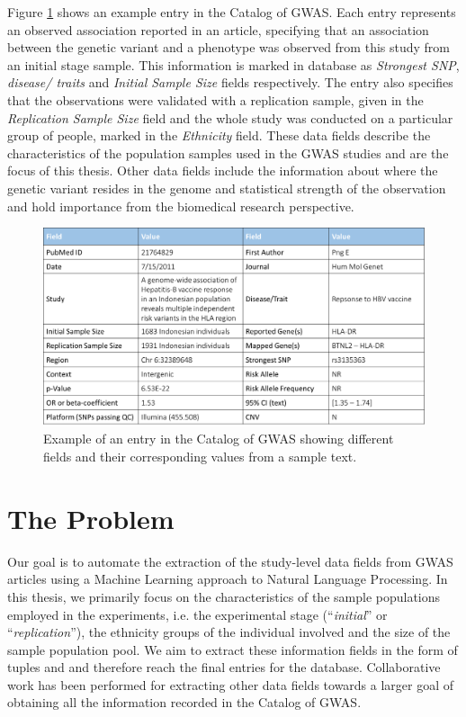 Figure \ref{figure:gwas-catalog-example} shows an example entry in the Catalog of GWAS. Each entry represents an observed association reported in an article, specifying that an association between the genetic variant and a phenotype was observed from this study from an initial stage sample. This information is marked in database as \emph{Strongest SNP}, \emph{disease/ traits} and \emph{Initial Sample Size} fields respectively. The entry also specifies that the observations were validated with a replication sample, given in the \emph{Replication Sample Size} field and the whole study was conducted on a particular group of people, marked in the \emph{Ethnicity} field. These data fields describe the characteristics of the population samples used in the GWAS studies and are the focus of this thesis. Other data fields include the information about where the genetic variant resides in the genome and statistical strength of the observation and hold importance from the biomedical research perspective.  

\begin{figure}[ht]
    \centering
    \includegraphics[width=0.85\linewidth]{Images/GWAS-Example.png}
    \caption{Example of an entry in the Catalog of GWAS showing different fields and their corresponding values from a sample text.}
    \label{figure:gwas-catalog-example}
\end{figure}

\section{The Problem}
\label{section:problem}
Our goal is to automate the extraction of the study-level data fields from GWAS articles using a Machine Learning approach to Natural Language Processing. In this thesis, we primarily focus on the characteristics of the sample populations employed in the experiments, i.e. the experimental stage (``\emph{initial}'' or ``\emph{replication}''), the ethnicity groups of the individual involved and the size of the sample population pool. We aim to extract these information fields in the form of tuples {\it <stage, ethnicity>} and {\it <stage, sample size>} and therefore reach the final entries for the database. Collaborative work \cite{jain2016weakly} has been performed for extracting other data fields towards a larger goal of obtaining all the information recorded in the Catalog of GWAS.


